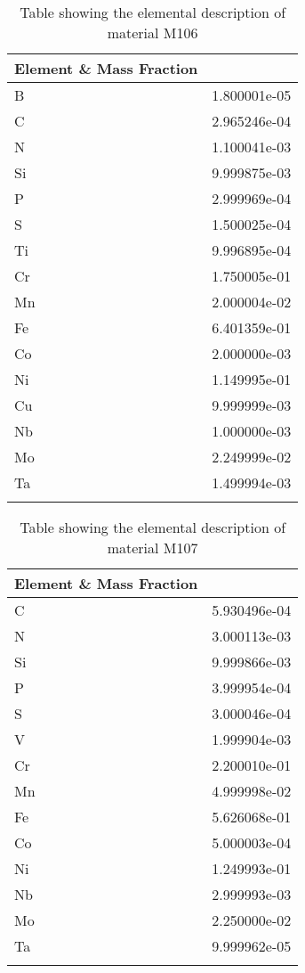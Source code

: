 \begin{centering}
\clearpage
\begin{longtable}[ht!]
{ p{} | p{} }
\hline
Element \& Mass Fraction\\
\hline
B &  1.800001e-05\\
C &  2.965246e-04\\
N &  1.100041e-03\\
Si &  9.999875e-03\\
P &  2.999969e-04\\
S &  1.500025e-04\\
Ti &  9.996895e-04\\
Cr &  1.750005e-01\\
Mn &  2.000004e-02\\
Fe &  6.401359e-01\\
Co &  2.000000e-03\\
Ni &  1.149995e-01\\
Cu &  9.999999e-03\\
Nb &  1.000000e-03\\
Mo &  2.249999e-02\\
Ta &  1.499994e-03\\
\caption{Table showing the elemental description of material M106}
\label{table:material_M106}
\end{longtable}
\clearpage

\begin{longtable}[ht!]
{ p{} | p{} }
\hline
Element \& Mass Fraction\\
\hline
C &  5.930496e-04\\
N &  3.000113e-03\\
Si &  9.999866e-03\\
P &  3.999954e-04\\
S &  3.000046e-04\\
V &  1.999904e-03\\
Cr &  2.200010e-01\\
Mn &  4.999998e-02\\
Fe &  5.626068e-01\\
Co &  5.000003e-04\\
Ni &  1.249993e-01\\
Nb &  2.999993e-03\\
Mo &  2.250000e-02\\
Ta &  9.999962e-05\\

\caption{Table showing the elemental description of material M107}
\label{table:material_M107}
\end{longtable}
\clearpage


\end{centering}
